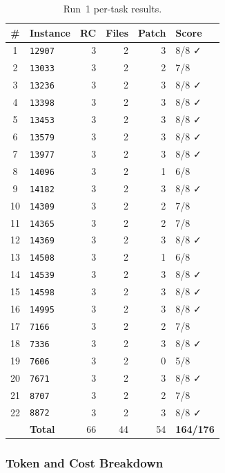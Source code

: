 \begin{table}[h]
\centering
\small
\caption{Run~1 per-task results.}\label{tab:r1-tasks}
\setlength{\tabcolsep}{4pt}
\begin{tabular}{clrrrl}
\toprule
\textbf{\#} & \textbf{Instance} & \textbf{RC} & \textbf{Files} & \textbf{Patch} & \textbf{Score} \\
\midrule
 1 & \texttt{12907} & 3 & 2 & 3 & 8/8 ✓ \\
 2 & \texttt{13033} & 3 & 2 & 2 & 7/8 \\
 3 & \texttt{13236} & 3 & 2 & 3 & 8/8 ✓ \\
 4 & \texttt{13398} & 3 & 2 & 3 & 8/8 ✓ \\
 5 & \texttt{13453} & 3 & 2 & 3 & 8/8 ✓ \\
 6 & \texttt{13579} & 3 & 2 & 3 & 8/8 ✓ \\
 7 & \texttt{13977} & 3 & 2 & 3 & 8/8 ✓ \\
 8 & \texttt{14096} & 3 & 2 & 1 & 6/8 \\
 9 & \texttt{14182} & 3 & 2 & 3 & 8/8 ✓ \\
10 & \texttt{14309} & 3 & 2 & 2 & 7/8 \\
11 & \texttt{14365} & 3 & 2 & 2 & 7/8 \\
12 & \texttt{14369} & 3 & 2 & 3 & 8/8 ✓ \\
13 & \texttt{14508} & 3 & 2 & 1 & 6/8 \\
14 & \texttt{14539} & 3 & 2 & 3 & 8/8 ✓ \\
15 & \texttt{14598} & 3 & 2 & 3 & 8/8 ✓ \\
16 & \texttt{14995} & 3 & 2 & 3 & 8/8 ✓ \\
17 & \texttt{7166}  & 3 & 2 & 2 & 7/8 \\
18 & \texttt{7336}  & 3 & 2 & 3 & 8/8 ✓ \\
19 & \texttt{7606}  & 3 & 2 & 0 & 5/8 \\
20 & \texttt{7671}  & 3 & 2 & 3 & 8/8 ✓ \\
21 & \texttt{8707}  & 3 & 2 & 2 & 7/8 \\
22 & \texttt{8872}  & 3 & 2 & 3 & 8/8 ✓ \\
\midrule
   & \textbf{Total} & 66 & 44 & 54 & \textbf{164/176} \\
\bottomrule
\end{tabular}
\end{table}

\subsubsection{Token and Cost Breakdown}

